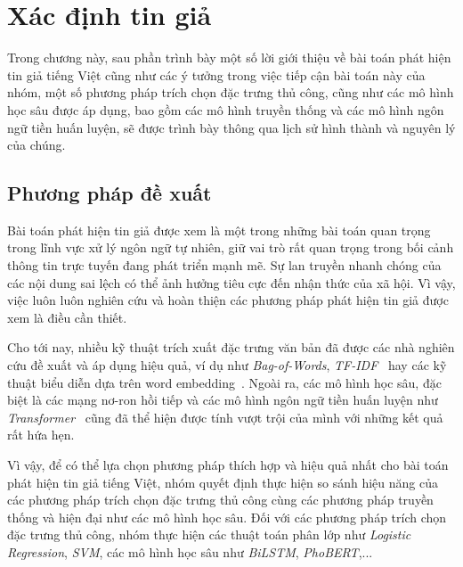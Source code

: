 \documentclass[12pt, a4paper]{report}
\begin{document}
\clearpage

\chapter{Xác định tin giả }

Trong chương này, sau phần trình bày một số lời giới thiệu về bài toán phát hiện tin giả tiếng Việt cũng như các ý tưởng trong việc tiếp cận bài toán này của nhóm, một số phương pháp trích chọn đặc trưng thủ công, cũng như các mô hình học sâu được áp dụng, bao gồm các mô hình truyền thống và các mô hình ngôn ngữ tiền huấn luyện, sẽ được trình bày thông qua lịch sử hình thành và nguyên lý của chúng.

\section{Phương pháp đề xuất}

Bài toán phát hiện tin giả được xem là một trong những bài toán quan trọng trong lĩnh vực xử lý ngôn ngữ tự nhiên, giữ vai trò rất quan trọng trong bối cảnh thông tin trực tuyến đang phát triển mạnh mẽ. Sự lan truyền nhanh chóng của các nội dung sai lệch có thể ảnh hưởng tiêu cực đến nhận thức của xã hội. Vì vậy, việc luôn luôn nghiên cứu và hoàn thiện các phương pháp phát hiện tin giả được xem là điều cần thiết. 

Cho tới nay, nhiều kỹ thuật trích xuất đặc trưng văn bản đã được các nhà nghiên cứu đề xuất và áp dụng hiệu quả, ví dụ như \textit{Bag-of-Words}, \textit{TF-IDF}~\cite{sparkjones1972idf} hay các kỹ thuật biểu diễn dựa trên word embedding~\cite{mikolov2013word2vec}. Ngoài ra, các mô hình học sâu, đặc biệt là các mạng nơ-ron hồi tiếp và các mô hình ngôn ngữ tiền huấn luyện như \textit{Transformer}~\cite{vaswani2017attention} cũng đã thể hiện được tính vượt trội của mình với những kết quả rất hứa hẹn.

Vì vậy, để có thể lựa chọn phương pháp thích hợp và hiệu quả nhất cho bài toán phát hiện tin giả tiếng Việt, nhóm quyết định thực hiện so sánh hiệu năng của các phương pháp trích chọn đặc trưng thủ công cùng các phương pháp truyền thống và hiện đại như các mô hình học sâu. Đối với các phương pháp trích chọn đặc trưng thủ công, nhóm thực hiện các thuật toán phân lớp như \textit{Logistic Regression}, \textit{SVM}, các mô hình học sâu như \textit{BiLSTM}, \textit{PhoBERT},...
\end{document}
